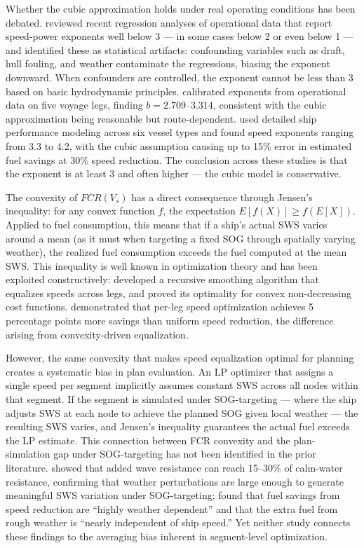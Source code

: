 \documentclass[review]{elsarticle}
\begin{document}
Whether the cubic approximation holds under real operating conditions has been debated. \cite{Psaraftis2023} reviewed recent regression analyses of operational data that report speed-power exponents well below 3 --- in some cases below 2 or even below 1 --- and identified these as statistical artifacts: confounding variables such as draft, hull fouling, and weather contaminate the regressions, biasing the exponent downward. When confounders are controlled, the exponent cannot be less than 3 based on basic hydrodynamic principles. \cite{Wang2012} calibrated exponents from operational data on five voyage legs, finding $b = 2.709$--$3.314$, consistent with the cubic approximation being reasonable but route-dependent. \cite{Taskar2020} used detailed ship performance modeling across six vessel types and found speed exponents ranging from 3.3 to 4.2, with the cubic assumption causing up to 15\% error in estimated fuel savings at 30\% speed reduction. The conclusion across these studies is that the exponent is at least 3 and often higher --- the cubic model is conservative.

The convexity of $FCR(V_s)$ has a direct consequence through Jensen's inequality: for any convex function $f$, the expectation $E[f(X)] \geq f(E[X])$. Applied to fuel consumption, this means that if a ship's actual SWS varies around a mean (as it must when targeting a fixed SOG through spatially varying weather), the realized fuel consumption exceeds the fuel computed at the mean SWS. This inequality is well known in optimization theory and has been exploited constructively: \cite{Norstad2011} developed a recursive smoothing algorithm that equalizes speeds across legs, and \cite{Hvattum2013} proved its optimality for convex non-decreasing cost functions. \cite{Fagerholt2010} demonstrated that per-leg speed optimization achieves 5 percentage points more savings than uniform speed reduction, the difference arising from convexity-driven equalization.

However, the same convexity that makes speed equalization optimal for planning creates a systematic bias in plan evaluation. An LP optimizer that assigns a single speed per segment implicitly assumes constant SWS across all nodes within that segment. If the segment is simulated under SOG-targeting --- where the ship adjusts SWS at each node to achieve the planned SOG given local weather --- the resulting SWS varies, and Jensen's inequality guarantees the actual fuel exceeds the LP estimate. This connection between FCR convexity and the plan-simulation gap under SOG-targeting has not been identified in the prior literature. \cite{Tezdogan2015} showed that added wave resistance can reach 15--30\% of calm-water resistance, confirming that weather perturbations are large enough to generate meaningful SWS variation under SOG-targeting; \cite{Taskar2020} found that fuel savings from speed reduction are ``highly weather dependent'' and that the extra fuel from rough weather is ``nearly independent of ship speed.'' Yet neither study connects these findings to the averaging bias inherent in segment-level optimization.
\end{document}
